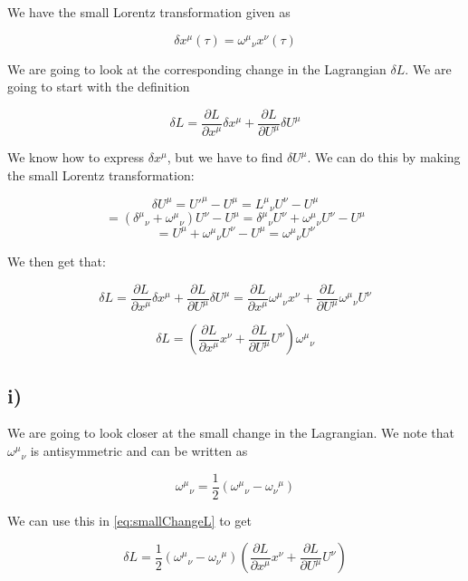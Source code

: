 \documentclass[a4paper,norsk, 10pt]{article}
\begin{document}
We have the small Lorentz transformation given as

\begin{equation}
\delta x^{\mu}(\tau) = {\omega^{\mu}}_{\nu}x^{\nu}(\tau)
\end{equation}

We are going to look at the corresponding change in the Lagrangian $\delta L$. We are going to start with the definition

$$
\delta L = \frac{\partial L}{\partial x^{\mu}}\delta x^{\mu} + \frac{\partial L}{\partial U^{\mu}}\delta U^{\mu}
$$

We know how to express $\delta x^{\mu}$, but we have to find $\delta U^{\mu}$. We can do this by making the small Lorentz transformation:

$$
\delta U^{\mu} = {U'}^{\mu} - {U}^{\mu} ={L^{\mu}}_{\nu}{U}^{\nu} - {U}^{\mu} 
$$
$$
 = ({\delta^{\mu}}_{\nu} + {\omega^{\mu}}_{\nu}){U}^{\nu} - {U}^{\mu} = {\delta^{\mu}}_{\nu}{U}^{\nu} + {\omega^{\mu}}_{\nu}{U}^{\nu} - {U}^{\mu}
$$
$$
= {U}^{\mu} + {\omega^{\mu}}_{\nu}{U}^{\nu} - {U}^{\mu} = {\omega^{\mu}}_{\nu}{U}^{\nu}
$$

We then get that:

$$
\delta L = \frac{\partial L}{\partial x^{\mu}}\delta x^{\mu} + \frac{\partial L}{\partial U^{\mu}}\delta U^{\mu} = \frac{\partial L}{\partial x^{\mu}}{\omega^{\mu}}_{\nu}x^{\nu} + \frac{\partial L}{\partial U^{\mu}}{\omega^{\mu}}_{\nu}U^{\nu}
$$

\begin{equation}
\delta L = \left(\frac{\partial L}{\partial x^{\mu}}x^{\nu} + \frac{\partial L}{\partial U^{\mu}}U^{\nu}\right){\omega^{\mu}}_{\nu}
\label{eq:smallChangeL}
\end{equation}

\subsection*{i)}

We are going to look closer at the small change in the Lagrangian. We note that ${\omega^{\mu}}_{\nu}$ is antisymmetric and can be written as

$$
{\omega^{\mu}}_{\nu} = \frac{1}{2}({\omega^{\mu}}_{\nu} - {\omega_{\nu}}^{\mu})
$$

We can use this in \eqref{eq:smallChangeL} to get

$$
\delta L = \frac{1}{2}({\omega^{\mu}}_{\nu} - {\omega_{\nu}}^{\mu})\left(\frac{\partial L}{\partial x^{\mu}}x^{\nu} + \frac{\partial L}{\partial U^{\mu}}U^{\nu}\right)
$$
\end{document}
